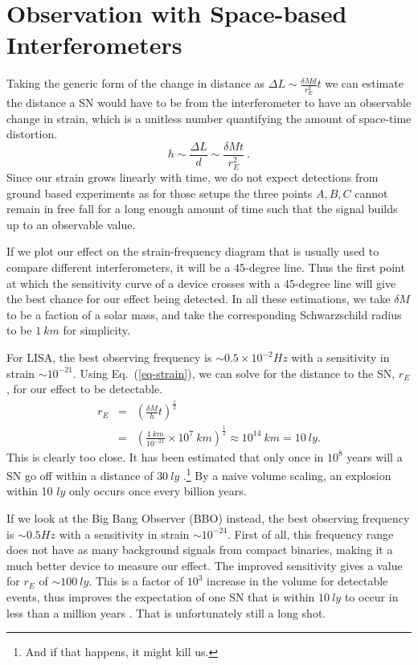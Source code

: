 \documentclass[aps,showpacs,twocolumn,floats,prd,superscriptaddress,nofootinbib]{revtex4-1}
\begin{document}
 \section{Observation with Space-based Interferometers}
\label{obs}
Taking the generic form of the change in distance as $\Delta L \sim \frac{\delta M d}{r_E^2} t$ we can estimate the distance a SN would have to be from the interferometer to have an observable change in strain, which is a unitless number quantifying the amount of space-time distortion.
\begin{equation}
h \sim \frac{\Delta L}{d} \sim \frac{\delta M t}{r_E^2}~.
\label{eq-strain}
\end{equation} 
Since our strain grows linearly with time, we do not expect detections from ground based experiments as for those setups the three points $A,B,C$ cannot remain in free fall for a long enough amount of time such that the signal builds up to an observable value. 

If we plot our effect on the strain-frequency diagram \cite{GWcurves} that is usually used to compare different interferometers, it will be a 45-degree line. Thus the first point at which the sensitivity curve of a device crosses with a 45-degree line will give the best chance for our effect being detected. In all these estimations, we take $\delta M$ to be a faction of a solar mass, and take the corresponding Schwarzschild radius to be $1~km$ for simplicity.

For LISA, the best observing frequency is $\sim 0.5 \times10^{-2} Hz$ with a sensitivity in strain $\sim 10^{-21}$. Using Eq.~(\ref{eq-strain}), we can solve for the distance to the SN, $r_E$, for our effect to be detectable.
\begin{eqnarray}
	r_E & = &  \left(  \frac{\delta M}{h} t \right)^\frac{1}{2} \label{Meas}	\\
	& = &  \left( \frac{1 \ km}{10^{-21}} \times 10^7 \ km \right)^\frac{1}{2} \approx 10^{14} \ km = 10 \ ly.
\end{eqnarray}
This is clearly too close. It has been estimated that only once in $10^8$ years will a SN go off within a distance of $30 \ ly$ \cite{EllSch93}.\footnote{And if that happens, it might kill us.} By a naive volume scaling, an explosion within 10 $ly$ only occurs once every billion years.

If we look at the Big Bang Observer (BBO) instead, the best observing frequency is $\sim 0.5 Hz$ with a sensitivity in strain $\sim 10^{-24}$. First of all, this frequency range does not have as many background signals from compact binaries, making it a much better device to measure our effect. The improved sensitivity gives a value for $r_E$ of $\sim 100 \ ly$. This is a factor of $10^3$ increase in the volume for detectable events, thus improves the expectation of one SN that is within $10 \ ly$ to occur in less than a million years . That is unfortunately still a long shot.
\end{document}
